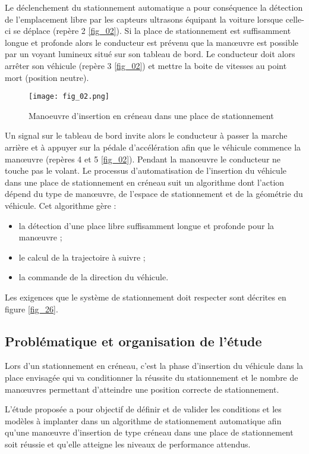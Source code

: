 Le déclenchement du stationnement automatique a pour conséquence la détection de l’emplacement libre par
les capteurs ultrasons équipant la voiture lorsque celle-ci se déplace (repère 2 \autoref{fig_02}).
Si la place de stationnement est suffisamment longue et profonde alors le conducteur est prévenu que la manœuvre
est possible par un voyant lumineux situé sur son tableau de bord. Le conducteur doit alors arrêter son véhicule
(repère 3 \autoref{fig_02}) et mettre la boite de vitesses au point mort (position neutre).


\begin{figure}[H]
\centering
\texttt{[image: fig\_02.png]}
\caption{Manoeuvre d’insertion en créneau dans une place de stationnement \label{fig_02}}
\end{figure}

Un signal sur le tableau de bord invite alors le conducteur à passer la marche arrière et à appuyer sur la pédale
d’accélération afin que le véhicule commence la manœuvre (repères 4 et 5 \autoref{fig_02}). Pendant la manœuvre le
conducteur ne touche pas le volant.
Le processus d’automatisation de l’insertion du véhicule dans une place de stationnement en créneau suit un
algorithme dont l’action dépend du type de manœuvre, de l’espace de stationnement et de la géométrie du
véhicule. Cet algorithme gère :
\begin{itemize}
\item la détection d’une place libre suffisamment longue et profonde pour la manœuvre ;
\item le calcul de la trajectoire à suivre ;
\item la commande de la direction du véhicule.
\end{itemize}
Les exigences que le système de stationnement doit respecter sont décrites en figure \autoref{fig_26}.

\subsection{Problématique et organisation de l’étude}
Lors d’un stationnement en créneau, c’est la phase d’insertion du véhicule dans la place envisagée qui va
conditionner la réussite du stationnement et le nombre de manœuvres permettant d’atteindre une position
correcte de stationnement.

\begin{obj}
L’étude proposée a pour objectif de définir et de valider les conditions et les modèles à implanter dans
un algorithme de stationnement automatique afin qu’une manœuvre d’insertion de type créneau dans
une place de stationnement soit réussie et qu’elle atteigne les niveaux de performance attendus.
\end{obj}


